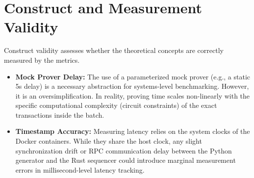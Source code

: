 \section{Construct and Measurement Validity}
\label{sec:construct_validity}
Construct validity assesses whether the theoretical concepts are correctly measured by the metrics.
\begin{itemize}
    \item \textbf{Mock Prover Delay:} The use of a parameterized mock prover (e.g., a static 5s delay) is a necessary abstraction for systems-level benchmarking. However, it is an oversimplification. In reality, proving time scales non-linearly with the specific computational complexity (circuit constraints) of the exact transactions inside the batch.
    \item \textbf{Timestamp Accuracy:} Measuring latency relies on the system clocks of the Docker containers. While they share the host clock, any slight synchronization drift or RPC communication delay between the Python generator and the Rust sequencer could introduce marginal measurement errors in millisecond-level latency tracking.
\end{itemize}